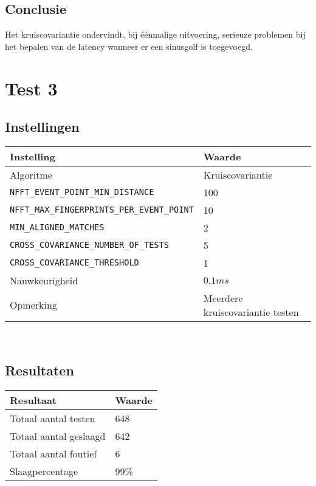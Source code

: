 \subsection*{Conclusie}

Het kruiscovariantie ondervindt, bij éénmalige uitvoering, serieuze problemen bij het bepalen van de latency wanneer er een sinusgolf is toegevoegd.

\section*{Test 3}

\subsection*{Instellingen}

\begin{tabular}{ l  l}
	\hline
	\textbf{Instelling} & \textbf{Waarde} \\
	\hline
	Algoritme & Kruiscovariantie \\
	\texttt{NFFT\_EVENT\_POINT\_MIN\_DISTANCE} & 100 \\
	\texttt{NFFT\_MAX\_FINGERPRINTS\_PER\_EVENT\_POINT} & 10 \\
	\texttt{MIN\_ALIGNED\_MATCHES} & 2 \\
	\texttt{CROSS\_COVARIANCE\_NUMBER\_OF\_TESTS} & 5 \\
	\texttt{CROSS\_COVARIANCE\_THRESHOLD} & 1 \\
	Nauwkeurigheid & $0.1ms$ \\
	Opmerking & Meerdere kruiscovariantie testen
\end{tabular}\\

\subsection*{Resultaten}

\begin{tabular}{ l  l}
	\hline
	\textbf{Resultaat} & \textbf{Waarde} \\
	\hline
	Totaal aantal testen & 648 \\
	Totaal aantal geslaagd & 642 \\
	Totaal aantal foutief & 6 \\
	Slaagpercentage & 99\% \\
\end{tabular}\\

